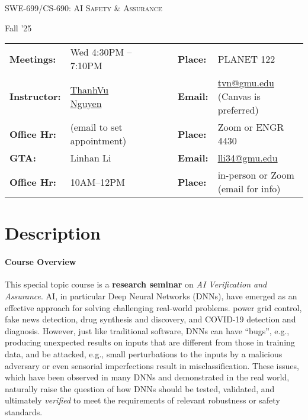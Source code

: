 \documentclass[11pt]{article}
\begin{document}
\begin{center}
{\Large \textsc{SWE-699/CS-690: AI Safety \& Assurance}}

\vspace{0.1in}
{\large Fall '25}
\end{center}

\begin{minipage}[t]{.75\textwidth}
    \centering
\begin{tabular}{llcccll}
  \toprule
  \textbf{Meetings:} & Wed 4:30PM -- 7:10PM  & & & & \textbf{Place:} & PLANET 122\\
\textbf{Instructor:} & \href{https://roars.dev}{ThanhVu Nguyen} & & &  & \textbf{Email:} &  \href{mailto:tvn@gmu.edu}{tvn@gmu.edu} (Canvas is preferred)\\
\textbf{Office Hr:} & (email to set appointment)& & & & \textbf{Place:} & Zoom or ENGR 4430\\
  \hline
\textbf{GTA:} & Linhan Li & & &  & \textbf{Email:} &  \href{mailto:lli34@gmu.edu}{lli34@gmu.edu}\\
\textbf{Office Hr:} & 10AM--12PM  & & & & \textbf{Place:} & in-person or Zoom (email for info) \\
\bottomrule
\end{tabular}
\end{minipage}
 

\section{Description}

\paragraph{Course Overview}
This special topic course is a \textbf{research seminar} on \emph{AI Verification and Assurance}.  AI, in particular Deep Neural Networks (DNNs), have emerged as an effective approach for solving challenging real-world problems. %
power grid control, fake news detection, drug synthesis and discovery, 
and COVID-19 detection and diagnosis.
However, just like traditional software, DNNs can have ``bugs'', e.g., producing unexpected results on inputs that are different from those in training data, and be attacked, e.g., small perturbations to the inputs by a malicious adversary or even sensorial imperfections result in misclassification.
These issues, which have been observed in many DNNs and demonstrated in the real world,  naturally raise the question of how DNNs should be tested, validated, and ultimately \emph{verified} to meet the requirements of relevant robustness or safety standards.
\end{document}
